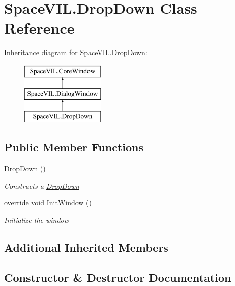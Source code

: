 \hypertarget{class_space_v_i_l_1_1_drop_down}{}\section{Space\+V\+I\+L.\+Drop\+Down Class Reference}
\label{class_space_v_i_l_1_1_drop_down}
Inheritance diagram for Space\+V\+I\+L.\+Drop\+Down\+:\begin{figure}[H]
\begin{center}
\leavevmode
\includegraphics[height=3.000000cm]{class_space_v_i_l_1_1_drop_down}
\end{center}
\end{figure}
\subsection*{Public Member Functions}
\begin{DoxyCompactItemize}
\item 
\mbox{\hyperlink{class_space_v_i_l_1_1_drop_down_ab5b7094ae2321a4b980e3503a1cf494a}{Drop\+Down}} ()
\begin{DoxyCompactList}\small\item\em Constructs a \mbox{\hyperlink{class_space_v_i_l_1_1_drop_down}{Drop\+Down}} \end{DoxyCompactList}\item 
override void \mbox{\hyperlink{class_space_v_i_l_1_1_drop_down_a291f706e5ec6558798d20fa428b2ba91}{Init\+Window}} ()
\begin{DoxyCompactList}\small\item\em Initialize the window \end{DoxyCompactList}\end{DoxyCompactItemize}
\subsection*{Additional Inherited Members}


\subsection{Constructor \& Destructor Documentation}
\mbox{\label{class_space_v_i_l_1_1_drop_down_ab5b7094ae2321a4b980e3503a1cf494a}} 
